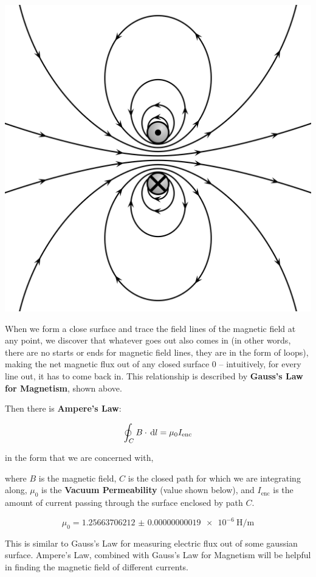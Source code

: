 \hfil \includegraphics[scale=0.05]{assets/mag-i-loop.png}

When we form a close surface and trace the field lines of the magnetic field at any point, we discover that whatever goes out also comes in (in other words, there are no starts or ends for magnetic field lines, they are in the form of loops), making the net magnetic flux out of any closed surface 0 -- intuitively, for every line out, it has to come back in. This relationship is described by \textbf{Gauss's Law for Magnetism}, shown above.

Then there is \textbf{Ampere's Law}:

\[\oint_C B \cdot \,\dif l = \mu_0 I_{\mathrm{enc}}\]

\hfil in the form that we are concerned with,

where $B$ is the magnetic field, $C$ is the closed path for which we are integrating along, $\mu_0$ is the \textbf{Vacuum Permeability} (value shown below), and $I_{\mathrm{enc}}$ is the amount of current passing through the surface enclosed by path $C$.

\[\mu_0 = \SI{1.25663706212(19)e-6}{\henry\per\meter}\]

This is similar to Gauss's Law for measuring electric flux out of some gaussian surface. Ampere's Law, combined with Gauss's Law for Magnetism will be helpful in finding the magnetic field of different currents.


